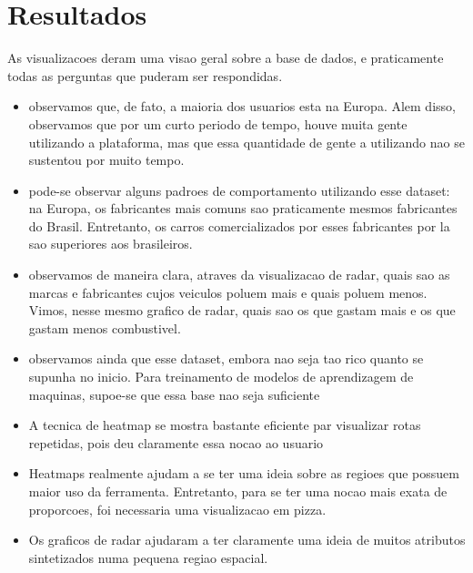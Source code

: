 \documentclass[10pt, conference]{IEEEtran}
\begin{document}



\section{Resultados}
%

As visualizacoes deram uma visao geral sobre a base de dados, e praticamente todas
as perguntas que puderam ser respondidas. 

\begin{itemize}
  
  \item observamos que, de fato, a maioria dos usuarios esta na Europa. Alem disso, observamos
    que por um curto periodo de tempo, houve muita gente utilizando a plataforma, mas que essa
    quantidade de gente a utilizando nao se sustentou por muito tempo.

  \item pode-se observar alguns padroes de comportamento utilizando esse dataset: na Europa, os
    fabricantes mais comuns sao praticamente mesmos fabricantes do Brasil. Entretanto, os carros
    comercializados por esses fabricantes por la sao superiores aos brasileiros.

  \item observamos de maneira clara, atraves da visualizacao de radar, quais sao as marcas
  e fabricantes cujos veiculos poluem mais e quais poluem menos. Vimos, nesse mesmo grafico de radar,  
  quais sao os que gastam mais e os que gastam menos combustivel.

  \item observamos ainda que esse dataset, embora nao seja tao rico quanto se supunha no inicio. Para
  treinamento de modelos de aprendizagem de maquinas, supoe-se que essa base nao seja suficiente

  \item A tecnica de heatmap se mostra bastante eficiente par visualizar rotas repetidas, pois deu
  claramente essa nocao ao usuario

  \item Heatmaps realmente ajudam a se ter uma ideia sobre as regioes que possuem maior uso da ferramenta.
  Entretanto, para se ter uma nocao mais exata de proporcoes, foi necessaria uma visualizacao em pizza.

  \item Os graficos de radar ajudaram a ter claramente uma ideia de muitos atributos sintetizados numa
  pequena regiao espacial.

\end{itemize}
\end{document}
